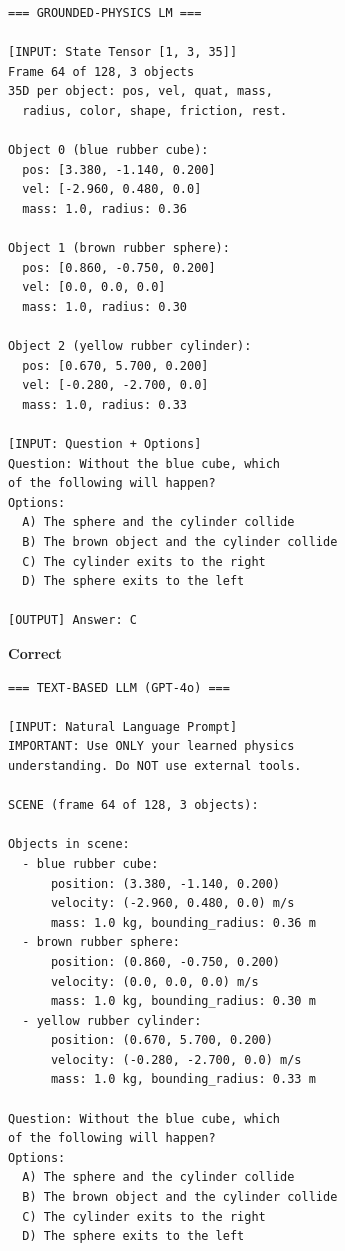 \documentclass[conference]{IEEEtran}
\theoremstyle{plain}
\theoremstyle{definition}
\theoremstyle{remark}
\begin{document}
\begin{figure}[t]
\centering
\footnotesize
\begin{minipage}[t]{0.48\textwidth}
\begin{verbatim}
=== GROUNDED-PHYSICS LM ===

[INPUT: State Tensor [1, 3, 35]]
Frame 64 of 128, 3 objects
35D per object: pos, vel, quat, mass,
  radius, color, shape, friction, rest.

Object 0 (blue rubber cube):
  pos: [3.380, -1.140, 0.200]
  vel: [-2.960, 0.480, 0.0]
  mass: 1.0, radius: 0.36

Object 1 (brown rubber sphere):
  pos: [0.860, -0.750, 0.200]
  vel: [0.0, 0.0, 0.0]
  mass: 1.0, radius: 0.30

Object 2 (yellow rubber cylinder):
  pos: [0.670, 5.700, 0.200]
  vel: [-0.280, -2.700, 0.0]
  mass: 1.0, radius: 0.33

[INPUT: Question + Options]
Question: Without the blue cube, which
of the following will happen?
Options:
  A) The sphere and the cylinder collide
  B) The brown object and the cylinder collide
  C) The cylinder exits to the right
  D) The sphere exits to the left

[OUTPUT] Answer: C
\end{verbatim}
\textbf{Correct} \checkmark
\end{minipage}
\hfill
\begin{minipage}[t]{0.48\textwidth}
\begin{verbatim}
=== TEXT-BASED LLM (GPT-4o) ===

[INPUT: Natural Language Prompt]
IMPORTANT: Use ONLY your learned physics
understanding. Do NOT use external tools.

SCENE (frame 64 of 128, 3 objects):

Objects in scene:
  - blue rubber cube:
      position: (3.380, -1.140, 0.200)
      velocity: (-2.960, 0.480, 0.0) m/s
      mass: 1.0 kg, bounding_radius: 0.36 m
  - brown rubber sphere:
      position: (0.860, -0.750, 0.200)
      velocity: (0.0, 0.0, 0.0) m/s
      mass: 1.0 kg, bounding_radius: 0.30 m
  - yellow rubber cylinder:
      position: (0.670, 5.700, 0.200)
      velocity: (-0.280, -2.700, 0.0) m/s
      mass: 1.0 kg, bounding_radius: 0.33 m

Question: Without the blue cube, which
of the following will happen?
Options:
  A) The sphere and the cylinder collide
  B) The brown object and the cylinder collide
  C) The cylinder exits to the right
  D) The sphere exits to the left


\end{verbatim}
\end{minipage}
\end{figure}
\end{document}
